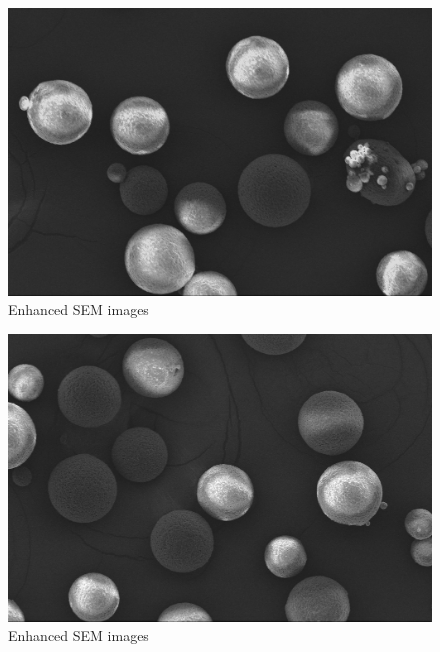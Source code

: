 \documentclass{article}
\begin{document}
                \begin{figure}[h!]
                    \centering 
                    \includegraphics[width=\textwidth]{Pictures/SEM/Edited/04_01.png}
                    \caption{Enhanced SEM images \autocites{Pixelmator_Pro}{GIMP}}
                    \label{fig:SEM_particles4}
                \end{figure}
            
                \begin{figure}[h!]
                    \centering 
                    \includegraphics[width=\textwidth]{Pictures/SEM/Edited/04_02.png}
                    \caption{Enhanced SEM images \autocites{Pixelmator_Pro}{GIMP}}
                    \label{fig:SEM_particles5}
                \end{figure}
            
\end{document}
